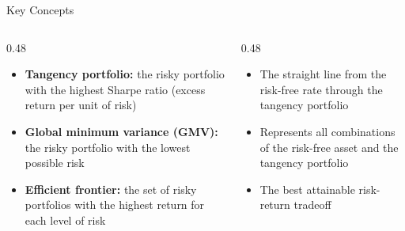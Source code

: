 \documentclass[aspectratio=169]{beamer}
\begin{document}
\begin{frame}{Key Concepts}
\begin{columns}[T]
\begin{column}{0.48\textwidth}
\begin{shadedbox}[title=\textbf{Portfolios}]
\begin{itemize}\small
  \item \textbf{Tangency portfolio:} the risky portfolio with the highest Sharpe ratio (excess return per unit of risk)
  \item \textbf{Global minimum variance (GMV):} the risky portfolio with the lowest possible risk
  \item \textbf{Efficient frontier:} the set of risky portfolios with the highest return for each level of risk
\end{itemize}
\end{shadedbox}
\end{column}
\begin{column}{0.48\textwidth}
\begin{shadedbox}[title=\textbf{Capital Allocation Line}]
\begin{itemize}\small
  \item The straight line from the risk-free rate through the tangency portfolio
  \item Represents all combinations of the risk-free asset and the tangency portfolio
  \item The best attainable risk-return tradeoff
\end{itemize}
\end{shadedbox}
\end{column}
\end{columns}
\end{frame}
\end{document}
